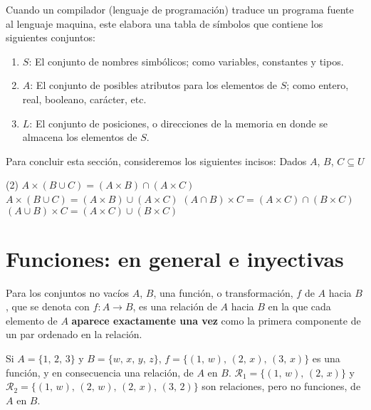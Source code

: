 \newpage

\begin{BOX}
    Cuando un compilador (lenguaje de programación) traduce un programa fuente al lenguaje maquina, este elabora una tabla de símbolos que contiene los siguientes conjuntos:
    \begin{enumerate}
        \item $S$: El conjunto de nombres simbólicos; como variables, constantes y tipos.
        \item $A$: El conjunto de posibles atributos para los elementos de $S$; como entero, real, booleano, carácter, etc.
        \item $L$: El conjunto de posiciones, o direcciones de la memoria en donde se almacena los elementos de $S$.
    \end{enumerate}
\end{BOX}

Para concluir esta sección, consideremos los siguientes incisos: Dados $A$, $B$, $C \subseteq U$
\begin{tasks}(2)
    \task $A \times (B \cup C) = (A \times B) \cap (A \times C)$
    \task $A \times (B \cup C) = (A \times B) \cup (A \times C)$
    \task $(A \cap B) \times C = (A \times C) \cap (B \times C)$
    \task $(A \cup B) \times C = (A \times C) \cup (B \times C)$
\end{tasks}

\section{Funciones: en general e inyectivas}

\begin{definicion}{}{}
    Para los conjuntos no vacíos $A$, $B$, una función, o transformación, $f$ de $A$ hacia $B$, que se denota con $f: A \longrightarrow B$, es una relación de $A$ hacia $B$ en la que cada elemento de $A$ \textbf{aparece exactamente una vez} como la primera componente de un par ordenado en la relación.
\end{definicion}

\begin{myexample}
    \label{jhbhdchsdfbj}
    Si $A = \{1, \, 2, \, 3 \}$ y $B = \{ w, \, x, \, y, \, z \}$, $f = \{ (1, \, w), \, (2, \, x), \, (3, \, x) \}$ es una función, y en consecuencia una relación, de $A$ en $B$. $\mathcal{R}_1 = \{ (1, \, w), \, (2, \, x) \}$ y $\mathcal{R}_2 = \{ (1, \, w), \, (2, \, w), \, (2, \, x), \, (3, \, 2) \}$ son relaciones, pero no funciones, de $A$ en $B$.
\end{myexample}

